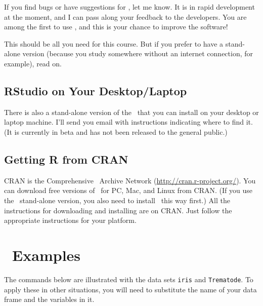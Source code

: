 If you find bugs or have suggestions for \Rstudio, let me know.  It is in rapid development
at the moment, and I can pass along your feedback to the developers.  You are among the 
first to use \Rstudio, and this is your chance to improve the software!

This should be all you need for this course.  But if you prefer to have a
stand-alone version (because you study somewhere without an internet
connection, for example), read on.


\subsection{RStudio on Your Desktop/Laptop}
There is also a stand-alone version of the \Rstudio\ that you can install on
your desktop or laptop machine.  I'll send you email with instructions indicating where to
find it.  (It is currently in beta and has not been released to the general public.)


\subsection{Getting R from CRAN}

CRAN is the Comprehensive \R\ Archive Network (\url{http://cran.r-project.org/}).  
You can download free versions of \R\ for PC, Mac, and Linux from CRAN.  (If you use
the \Rstudio\ stand-alone version, you also need to install \R\ this way first.)
All the instructions for downloading and installing are on CRAN.  Just 
follow the appropriate instructions for your platform.

\newpage

\section{\R\ Examples}
\vspace{-3mm}
The commands below are illustrated with the data sets \verb!iris! and 
\verb!Trematode!.  To apply these in other situations, you will need to 
substitute the name of your data frame and the variables in it.

